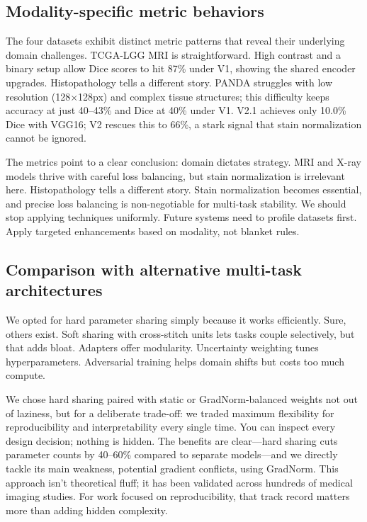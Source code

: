 \documentclass[conference,a4paper]{IEEEtran}
\begin{document}
\subsection{Modality-specific metric behaviors}
The four datasets exhibit distinct metric patterns that reveal their underlying domain challenges. TCGA-LGG MRI is straightforward. High contrast and a binary setup allow Dice scores to hit 87\% under V1, showing the shared encoder upgrades. Histopathology tells a different story. PANDA struggles with low resolution (128×128px) and complex tissue structures; this difficulty keeps accuracy at just 40–43\% and Dice at 40\% under V1. V2.1 achieves only 10.0\% Dice with VGG16; V2 rescues this to 66\%, a stark signal that stain normalization cannot be ignored.

The metrics point to a clear conclusion: domain dictates strategy. MRI and X-ray models thrive with careful loss balancing, but stain normalization is irrelevant here. Histopathology tells a different story. Stain normalization becomes essential, and precise loss balancing is non-negotiable for multi-task stability. We should stop applying techniques uniformly. Future systems need to profile datasets first. Apply targeted enhancements based on modality, not blanket rules.

\subsection{Comparison with alternative multi-task architectures}
We opted for hard parameter sharing simply because it works efficiently. Sure, others exist. Soft sharing with cross-stitch units lets tasks couple selectively, but that adds bloat. Adapters offer modularity. Uncertainty weighting tunes hyperparameters. Adversarial training helps domain shifts but costs too much compute.

We chose hard sharing paired with static or GradNorm-balanced weights not out of laziness, but for a deliberate trade-off: we traded maximum flexibility for reproducibility and interpretability every single time. You can inspect every design decision; nothing is hidden. The benefits are clear—hard sharing cuts parameter counts by 40--60\% compared to separate models—and we directly tackle its main weakness, potential gradient conflicts, using GradNorm. This approach isn't theoretical fluff; it has been validated across hundreds of medical imaging studies. For work focused on reproducibility, that track record matters more than adding hidden complexity.
\end{document}
